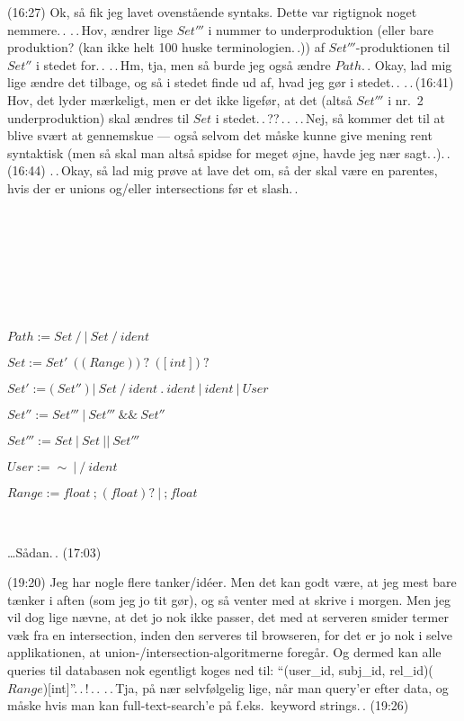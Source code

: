 \documentclass{report}
\begin{document}
(16:27) Ok, så fik jeg lavet ovenstående syntaks. Dette var rigtignok noget nemmere.\,. .\,.\,Hov, ændrer lige $Set'''$ i nummer to underproduktion (eller bare produktion? (kan ikke helt 100 huske terminologien.\,.)) af $Set'''$-produktionen til $Set''$ i stedet for.\,. .\,.\,Hm, tja, men så burde jeg også ændre $Path$.\,. Okay, lad mig lige ændre det tilbage, og så i stedet finde ud af, hvad jeg gør i stedet.\,.  .\,.\,(16:41) Hov, det lyder mærkeligt, men er det ikke ligefør, at det (altså $Set'''$ i nr.\ 2 underproduktion) skal ændres til 
$Set$ i stedet.\,.\,??\,.\,. .\,.\,Nej, så kommer det til at blive svært at gennemskue --- også selvom det måske kunne give mening rent syntaktisk (men så skal man altså spidse for meget øjne, havde jeg nær sagt.\,.).\,. (16:44) .\,.\,Okay, så lad mig prøve at lave det om, så der skal være en parentes, hvis der er unions og/eller intersections før et slash.\,.


\ 

\ 

\ 

\ 

$Path :=  Set\ \texttt{/}\ |\ Set\ \texttt{/}\ ident$


$Set := Set'\ (\texttt{(}\ Range\ \texttt{)})?\ (\texttt{[}\ int\ \texttt{]})? 
$ 

$Set' := \texttt{(}\ Set''\ \texttt{)}\ |\ 
	Set\ \texttt{/}\ ident\ \texttt{.}\ ident\ |\ 
	ident\ |\ 
	User
$ 

$Set'' := Set'''\ |\ Set'''\ \texttt{\&\&}\ Set''$ 

$Set''' := Set\ |\ Set\ \texttt{||}\ Set'''$ 


$User := \mathtt{\sim}\ |\ \texttt{/}\ ident$ 

$Range := float\ \texttt{;}\ (float)?\ |\ \texttt{;}\ float$

\ 

\ldots Sådan.\,. (17:03)

(19:20) Jeg har nogle flere tanker/idéer. Men det kan godt være, at jeg mest bare tænker i aften (som jeg jo tit gør), og så venter med at skrive i morgen. Men jeg vil dog lige nævne, at det jo nok ikke passer, det med at serveren smider termer væk fra en intersection, inden den serveres til browseren, for det er jo nok i selve applikationen, at union-/intersection-algoritmerne foregår. Og dermed kan alle queries til databasen nok egentligt koges ned til: ``(user\_id, subj\_id, rel\_id)($Range$)[int]''.\,.\,!\,.\,. .\,.\,Tja, på nær selvfølgelig lige, når man query'er efter data, og måske hvis man kan full-text-search'e på f.eks.\ keyword strings.\,. (19:26)
\end{document}
